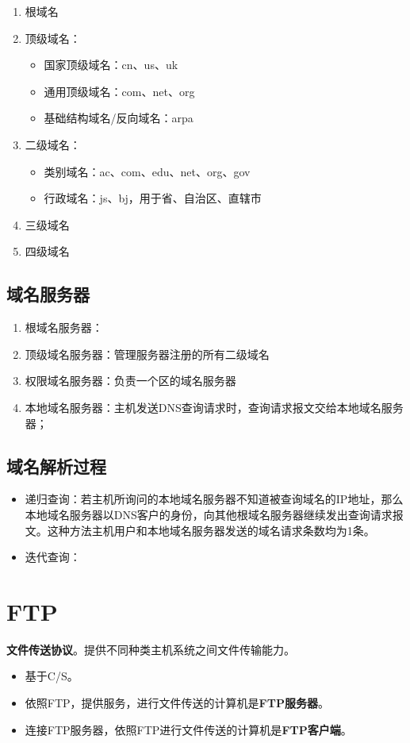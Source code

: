 \begin{enumerate}
    \item 根域名
    \item 顶级域名：\begin{itemize}
        \item 国家顶级域名：cn、us、uk
        \item 通用顶级域名：com、net、org
        \item 基础结构域名/反向域名：arpa
    \end{itemize}
    \item 二级域名：\begin{itemize}
        \item 类别域名：ac、com、edu、net、org、gov
        \item 行政域名：js、bj，用于省、自治区、直辖市
    \end{itemize}
    \item 三级域名
    \item 四级域名
\end{enumerate}


\subsection{域名服务器}
\begin{enumerate}
    \item 根域名服务器：
    \item 顶级域名服务器：管理服务器注册的所有二级域名
    \item 权限域名服务器：负责一个区的域名服务器
    \item 本地域名服务器：主机发送DNS查询请求时，查询请求报文交给本地域名服务器；
\end{enumerate}


\subsection{域名解析过程}

\begin{itemize}
    \item 递归查询：若主机所询问的本地域名服务器不知道被查询域名的IP地址，那么本地域名服务器以DNS客户的身份，向其他根域名服务器继续发出查询请求报文。这种方法主机用户和本地域名服务器发送的域名请求条数均为1条。
    \item 迭代查询：
\end{itemize}


\section{FTP}
\textbf{文件传送协议}。提供不同种类主机系统之间文件传输能力。
\begin{itemize}
    \item 基于C/S。
    \item 依照FTP，提供服务，进行文件传送的计算机是\textbf{FTP服务器}。
    \item 连接FTP服务器，依照FTP进行文件传送的计算机是\textbf{FTP客户端}。
\end{itemize}

